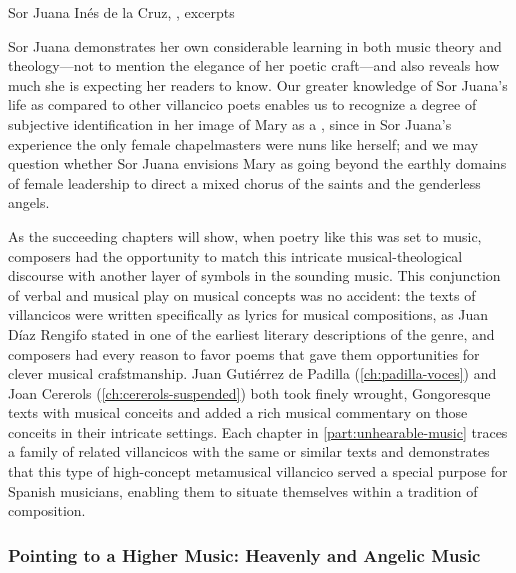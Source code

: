 {Sor Juana Inés de la Cruz, ,
excerpts}

Sor Juana demonstrates her own considerable learning in both music theory and
theology---not to mention the elegance of her poetic craft---and also reveals
how much she is expecting her readers to know.%
    \Autocite{Stevenson:SorJuanaMusicalRapports}
Our greater knowledge of Sor Juana's life as compared to other villancico poets
enables us to recognize a degree of subjective identification in her image of
Mary as a , since in Sor Juana's experience the only
female chapelmasters were nuns like herself; and we may question whether Sor
Juana envisions Mary as going beyond the earthly domains of female leadership
to direct a mixed chorus of the saints and the genderless angels. %

As the succeeding chapters will show, when poetry like this was set to music,
composers had the opportunity to match this intricate musical-theological
discourse with another layer of symbols in the sounding music.
This conjunction of verbal and musical play on musical concepts was no
accident: the texts of villancicos were written specifically as lyrics for
musical compositions, as Juan Díaz Rengifo stated in one of the earliest
literary descriptions of the genre, and composers had every reason to favor
poems that gave them opportunities for clever musical crafstmanship.%
    \Autocite{Rengifo:ArteMetrica}
Juan Gutiérrez de Padilla (\cref{ch:padilla-voces}) and Joan Cererols
(\cref{ch:cererols-suspended}) both took finely wrought, Gongoresque texts with
musical conceits and added a rich musical commentary on those conceits in their
intricate settings.
Each chapter in \cref{part:unhearable-music} traces a family of related
villancicos with the same or similar texts and demonstrates that this type of
high-concept metamusical villancico served a special purpose for Spanish
musicians, enabling them to situate themselves within a tradition of
composition.

\subsubsection{Pointing to a Higher Music: Heavenly and Angelic Music}


